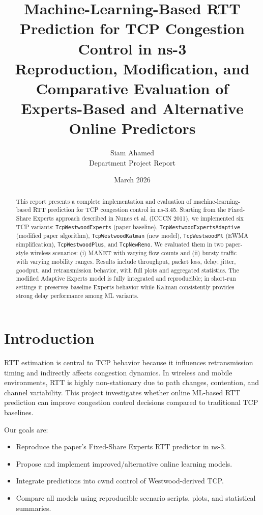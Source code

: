 \documentclass[11pt,a4paper]{article}
\title{Machine-Learning-Based RTT Prediction for TCP Congestion Control in ns-3\\
\large Reproduction, Modification, and Comparative Evaluation of Experts-Based and Alternative Online Predictors}
\author{Siam Ahamed\\
Department Project Report}
\date{March 2026}
\begin{document}
\maketitle

\begin{abstract}
This report presents a complete implementation and evaluation of machine-learning-based RTT prediction for TCP congestion control in ns-3.45. Starting from the Fixed-Share Experts approach described in Nunes et al. (ICCCN 2011), we implemented six TCP variants: \texttt{TcpWestwoodExperts} (paper baseline), \texttt{TcpWestwoodExpertsAdaptive} (modified paper algorithm), \texttt{TcpWestwoodKalman} (new model), \texttt{TcpWestwoodMl} (EWMA simplification), \texttt{TcpWestwoodPlus}, and \texttt{TcpNewReno}. We evaluated them in two paper-style wireless scenarios: (i) MANET with varying flow counts and (ii) bursty traffic with varying mobility ranges. Results include throughput, packet loss, delay, jitter, goodput, and retransmission behavior, with full plots and aggregated statistics. The modified Adaptive Experts model is fully integrated and reproducible; in short-run settings it preserves baseline Experts behavior while Kalman consistently provides strong delay performance among ML variants.
\end{abstract}

\section{Introduction}
RTT estimation is central to TCP behavior because it influences retransmission timing and indirectly affects congestion dynamics. In wireless and mobile environments, RTT is highly non-stationary due to path changes, contention, and channel variability. This project investigates whether online ML-based RTT prediction can improve congestion control decisions compared to traditional TCP baselines.

Our goals are:
\begin{itemize}
    \item Reproduce the paper's Fixed-Share Experts RTT predictor in ns-3.
    \item Propose and implement improved/alternative online learning models.
    \item Integrate predictions into cwnd control of Westwood-derived TCP.
    \item Compare all models using reproducible scenario scripts, plots, and statistical summaries.
\end{itemize}
\end{document}
